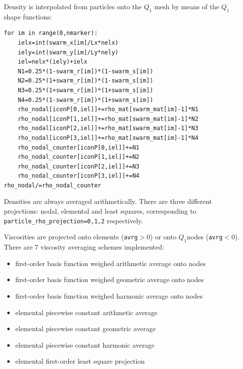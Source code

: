 Density is interpolated from particles onto the $Q_1$ mesh by means of the $Q_1$ shape functions:
\begin{lstlisting}
for im in range(0,nmarker):
    ielx=int(swarm_x[im]/Lx*nelx)
    iely=int(swarm_y[im]/Ly*nely)
    iel=nelx*(iely)+ielx
    N1=0.25*(1-swarm_r[im])*(1-swarm_s[im])
    N2=0.25*(1+swarm_r[im])*(1-swarm_s[im])
    N3=0.25*(1+swarm_r[im])*(1+swarm_s[im])
    N4=0.25*(1-swarm_r[im])*(1+swarm_s[im])
    rho_nodal[iconP[0,iel]]+=rho_mat[swarm_mat[im]-1]*N1
    rho_nodal[iconP[1,iel]]+=rho_mat[swarm_mat[im]-1]*N2
    rho_nodal[iconP[2,iel]]+=rho_mat[swarm_mat[im]-1]*N3
    rho_nodal[iconP[3,iel]]+=rho_mat[swarm_mat[im]-1]*N4
    rho_nodal_counter[iconP[0,iel]]+=N1
    rho_nodal_counter[iconP[1,iel]]+=N2
    rho_nodal_counter[iconP[2,iel]]+=N3
    rho_nodal_counter[iconP[3,iel]]+=N4
rho_nodal/=rho_nodal_counter
\end{lstlisting}



Densities are always averaged arithmetically. 
There are three different projections: nodal, elemental and least squares,
corresponding to \lstinline{particle_rho_projection=0,1,2} respectively.

Viscosities are projected onto elements ({\tt avrg}$>0$) or onto $Q_1$nodes ({\tt avrg}$<0$).
There are 7 viscosity averaging schemes implemented:
\begin{itemize}
\item[{\tt avrg}=-1] first-order basis function weighed arithmetic average onto nodes
\item[{\tt avrg}=-2] first-order basis function weighed geometric average onto nodes
\item[{\tt avrg}=-3] first-order basis function weighed harmonic average onto nodes
\item[{\tt avrg}=+1] elemental piecewise constant arithmetic average 
\item[{\tt avrg}=+2] elemental piecewise constant geometric average 
\item[{\tt avrg}=+3] elemental piecewise constant harmonic average 
\item[{\tt avrg}=+4] elemental first-order least square projection 
\end{itemize}

